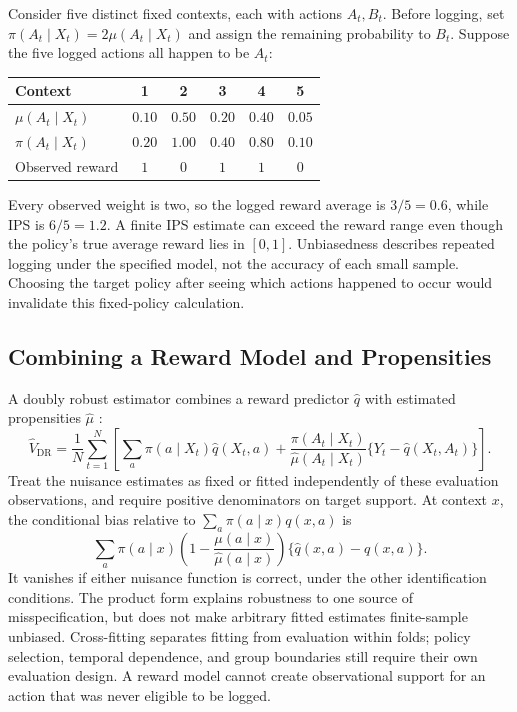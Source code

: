 Consider five distinct fixed contexts, each with actions $A_t,B_t$. Before logging, set $\pi(A_t\mid X_t)=2\mu(A_t\mid X_t)$ and assign the remaining probability to $B_t$. Suppose the five logged actions all happen to be $A_t$:
\begin{center}
\small
\begin{tabular}{lccccc}
\toprule
Context & 1 & 2 & 3 & 4 & 5 \\
\midrule
$\mu(A_t\mid X_t)$ & $0.10$ & $0.50$ & $0.20$ & $0.40$ & $0.05$ \\
$\pi(A_t\mid X_t)$ & $0.20$ & $1.00$ & $0.40$ & $0.80$ & $0.10$ \\
Observed reward & $1$ & $0$ & $1$ & $1$ & $0$ \\
\bottomrule
\end{tabular}
\end{center}
Every observed weight is two, so the logged reward average is $3/5=0.6$, while IPS is $6/5=1.2$. A finite IPS estimate can exceed the reward range even though the policy's true average reward lies in $[0,1]$. Unbiasedness describes repeated logging under the specified model, not the accuracy of each small sample. Choosing the target policy after seeing which actions happened to occur would invalidate this fixed-policy calculation.

\subsection{Combining a Reward Model and Propensities}

A doubly robust estimator combines a reward predictor $\widehat q$ with estimated propensities $\widehat\mu$ \citep{dudik2011doublyrobust}:
\[
\widehat V_{\mathrm{DR}}=\frac1N\sum_{t=1}^N\left[
\sum_a\pi(a\mid X_t)\widehat q(X_t,a)
+\frac{\pi(A_t\mid X_t)}{\widehat\mu(A_t\mid X_t)}
\{Y_t-\widehat q(X_t,A_t)\}\right].
\]
Treat the nuisance estimates as fixed or fitted independently of these evaluation observations, and require positive denominators on target support. At context $x$, the conditional bias relative to $\sum_a\pi(a\mid x)q(x,a)$ is
\[
\sum_a\pi(a\mid x)
\left(1-\frac{\mu(a\mid x)}{\widehat\mu(a\mid x)}\right)
\{\widehat q(x,a)-q(x,a)\}.
\]
It vanishes if either nuisance function is correct, under the other identification conditions. The product form explains robustness to one source of misspecification, but does not make arbitrary fitted estimates finite-sample unbiased. Cross-fitting separates fitting from evaluation within folds; policy selection, temporal dependence, and group boundaries still require their own evaluation design. A reward model cannot create observational support for an action that was never eligible to be logged.

